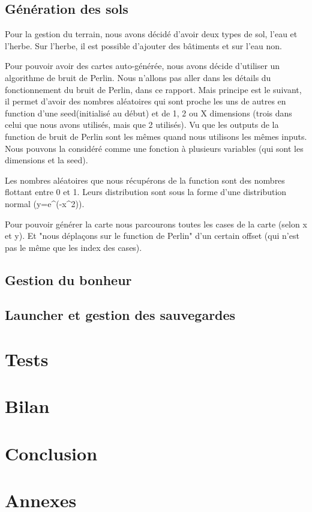 \documentclass[a4paper,10pt,openany,oneside]{book}
\begin{document}
\section{Génération des sols}
Pour la gestion du terrain, nous avons décidé d'avoir deux types de sol, l'eau et l'herbe. Sur l'herbe, il est possible d'ajouter des bâtiments et sur l'eau non.

Pour pouvoir avoir des cartes auto-générée, nous avons décide d'utiliser un algorithme de bruit de Perlin. Nous n'allons pas aller dans les détails du fonctionnement du bruit de Perlin, dans ce rapport. Mais principe est le suivant, il permet d'avoir des nombres aléatoires qui sont proche les uns de autres en function d'une seed(initialisé au début) et de 1, 2 ou X dimensions (trois dans celui que nous avons utilisés, mais que 2 utilisés).  Vu que les outputs de la function de bruit de Perlin sont les mêmes quand nous utilisons les mêmes inputs. Nous pouvons la considéré comme une fonction à plusieurs variables (qui sont les dimensions et la seed). 

Les nombres aléatoires que nous récupérons de la function sont des nombres flottant entre 0 et 1.
Leurs distribution sont sous la forme d'une distribution normal (y=e^(-x^2)).

Pour pouvoir générer la carte nous parcourons toutes les cases de la carte (selon x et y). Et "nous déplaçons sur le function de Perlin" d'un certain offset (qui n'est pas le même que les index des cases). 
\section{Gestion du  bonheur}

\section{Launcher et gestion des sauvegardes}


\chapter{Tests}
\thispagestyle{headings}


\chapter{Bilan}
\thispagestyle{headings}


\chapter{Conclusion}
\thispagestyle{headings}


\chapter{Annexes}
\thispagestyle{headings}
\end{document}
